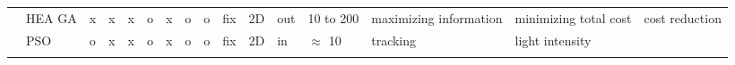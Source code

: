 \begin{landscape}
\begin{table}[]
\begin{tabular}{@{}  l|p{1.6cm} p{1.7cm} l  l p{0.659cm} p{0.612cm}p{.659cm} p{1.11cm} p{1.5cm} p{1.57cm}p{0.9cm}p{1.6cm}p{1.3cm}p{1.2cm} p{1.2cm}@{}}
\multicolumn{1}{l|}{\cellcolor[HTML]{FFFFFF}\cite{101*topcuoglu2009}} & HEA GA                                                                                                         & x                                                                     & x                                              & x                                              & o                                              & x                                                & o                                                 & o                                                 & fix                                                       & 2D                                                                                                              & out                                                          & 10 to 200                                                                                                 & maximizing information                                                                                                      & minimizing total cost         & cost reduction                  \\
\rowcolor[HTML]{EFEFEF} 
\multicolumn{1}{l|}{\cellcolor[HTML]{EFEFEF}\cite{33*reddy2012}}  & PSO                                                                                                            & o                                                                     & x                                              & x                                              & o                                              & x                                                & o                                                 & o                                                 & fix                                                       & 2D                                                                                                              & in                                                           & $\approx$ 10                                                                                              & tracking                                                                                                                    & \multicolumn{2}{l}{\cellcolor[HTML]{EFEFEF}light intensity}      \\
\rowcolor[HTML]{FFFFFF} 

\end{tabular}
\end{table}
\end{landscape}
